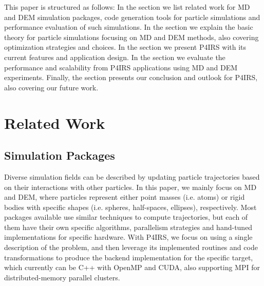\documentclass[Afour,sageh,times]{sagej}
\begin{document}
This paper is structured as follows: In the  section we list related work for MD and DEM simulation packages, code generation tools for particle simulations and performance evaluation of such simulations.
In the  section we explain the basic theory for particle simulations focusing on MD and DEM methods, also covering optimization strategies and choices.
In the  section we present P4IRS with its current features and application design.
In the  section we evaluate the performance and scalability from P4IRS applications using \ac{MD} and \ac{DEM} experiments.
Finally, the  section presents our conclusion and outlook for P4IRS, also covering our future work.

\section{Related Work}
\label{sec:related_work}

\subsection{Simulation Packages}
\label{sec:packages}

Diverse simulation fields can be described by updating particle trajectories based on their interactions with other particles.
In this paper, we mainly focus on \ac{MD} and \ac{DEM}, where particles represent either point masses (i.e. atoms) or rigid bodies with specific shapes (i.e. spheres, half-spaces, ellipses), respectively.
Most packages available use similar techniques to compute trajectories, but each of them have their own specific algorithms, parallelism strategies and hand-tuned implementations for specific hardware.
With P4IRS, we focus on using a single description of the problem, and then leverage its implemented routines and code transformations to produce the backend implementation for the specific target, which currently can be C++ with OpenMP and CUDA, also supporting MPI for distributed-memory parallel clusters.
\end{document}

